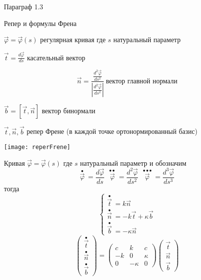\begin{title}[\Large]
  Параграф 1.3
\end{title}

\begin{title}[\Large]
  Репер и формулы Френа
\end{title}

\begin{define}
  $\vec \varphi = \vec \varphi (s)$ регулярная кривая где $s$ натуральный
  параметр

  $\vec t = \frac{d \vec \varphi}{ds}$ касательный вектор

  $$
  \vec n = \frac{\frac{d^2 \vec \varphi}{ds^2}}{\left|
  \frac{d^2 \vec \varphi}{ds^2}\right|} ~ \text{вектор главной нормали}
  $$

  $\vec b = [\vec t, \vec n]$ вектор бинормали

  $\vec t, \vec n, \vec b$ репер Френе (в каждой точке ортонормированный базис)

  \texttt{[image: reperFrene]}
\end{define}

\begin{block}
  Кривая $\vec \varphi = \vec \varphi(s)$ где $s$ натуральный параметр и
  обозначим
  $$
  \stackrel{\bullet}{\vec \varphi} ~ = \frac{d \vec \varphi}{ds} ~~~
  \stackrel{\bullet \bullet}{\vec \varphi} ~ = \frac{d^2 \vec \varphi}{ds^2} ~~~
  \stackrel{\bullet \bullet \bullet}{\vec \varphi} ~ =
  \frac{d^3 \vec \varphi}{ds^3}
  $$
  тогда
  $$
  \left\{
  \begin{array}{l}
    \stackrel{\bullet}{\vec t} ~ = k \vec n \\
    \stackrel{\bullet}{\vec n} ~ = -k \vec t + \kappa \vec b \\
    \stackrel{\bullet}{\vec b} ~ = - \kappa \vec n
  \end{array}
  \right.
  $$
  $$
  \left(
  \begin{array}{c}
    \stackrel{\bullet}{\vec t} \\
    \stackrel{\bullet}{\vec n} \\
    \stackrel{\bullet}{\vec b}
  \end{array}
  \right) =
  \left(
  \begin{array}{ccc}
    c & k & c \\
    -k & 0 & \kappa \\
    0 & -\kappa & 0
  \end{array}
  \right)
  \left(
  \begin{array}{ccc}
    \vec t \\
    \vec n \\
    \vec b
  \end{array}
  \right)
  $$
\end{block}

